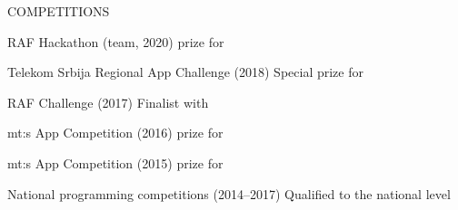 \begin{minipage}[t]{\linewidth}
{\alignRight\titleFont\light COMPETITIONS}\linebreak\newline

{\alignRight\rSubtitleFont\bold RAF Hackathon \light (team, 2020)}\newline
{\alignRight\largeContentFont\medium {} prize for }\newline

%
{\alignRight\rSubtitleFont\bold Telekom Srbija Regional App \alignRight Challenge \light (2018)}\newline
{\alignRight\largeContentFont\medium Special prize for }\newline

{\alignRight\rSubtitleFont\bold RAF Challenge \light (2017)}\newline
{\alignRight\largeContentFont\medium Finalist with }\newline

%
{\alignRight\rSubtitleFont\bold mt:s App Competition \light (2016)}\newline
{\alignRight\largeContentFont\medium {} prize for }\newline

{\alignRight\rSubtitleFont\bold mt:s App Competition \light (2015)}\newline
{\alignRight\largeContentFont\medium {} prize for }\newline

{\alignRight\rSubtitleFont\bold National programming \alignRight competitions \light (2014--2017)}\newline
{\alignRight\largeContentFont\medium Qualified to the national level}\newline


\end{minipage}
